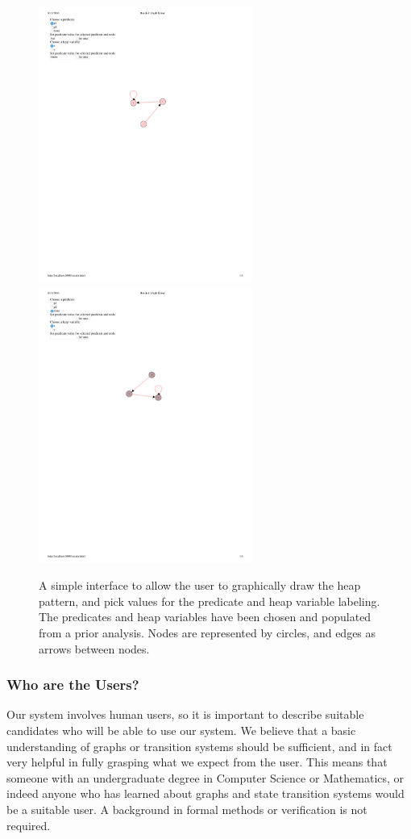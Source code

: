 \begin{figure}
  \centering
  \includegraphics[width=7cm]{fig/predicate-heapvar-val.pdf}
  \includegraphics[width=7cm]{fig/basic-graph.pdf}
  \caption{A simple interface to allow the user to graphically draw the heap pattern, and pick values for the predicate and heap variable labeling. The predicates and heap variables have been chosen and populated from a prior analysis. Nodes are represented by circles, and edges as arrows between nodes.
  }
  \label{fig:basic-graph-interface}
\end{figure}

\subsubsection{Who are the Users?}
\label{sec:who-are-the-users}
Our system involves human users, so it is important to describe suitable candidates who will be able to use our system. We believe that a basic understanding of graphs or transition systems should be sufficient, and in fact very helpful in fully grasping what we expect from the user. This means that someone with an undergraduate degree in Computer Science or Mathematics, or indeed anyone who has learned about graphs and state transition systems would be a suitable user. A background in formal methods or verification is not required.

